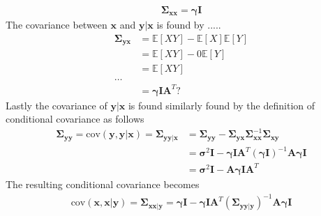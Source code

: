 \begin{align*}
\boldsymbol{\Sigma}_{\textbf{xx}} = \boldsymbol{\gamma}\textbf{I}
\end{align*} 
The covariance between $\textbf{x}$ and $\textbf{y}\vert\textbf{x}$ is found by .....
\begin{align*}
\boldsymbol{\Sigma}_{\textbf{yx}} &= \mathbb{E}[XY] - \mathbb{E}[X]\mathbb{E}[Y]\\
&= \mathbb{E}[XY] - 0 \mathbb{E}[Y] \\
&= \mathbb{E}[XY]\\
\hdots \\
&= \boldsymbol{\gamma}\textbf{I}\textbf{A}^T?
\end{align*}
Lastly the covariance of $\textbf{y}\vert \textbf{x}$ is found similarly found by the definition of conditional covariance as follows 
\begin{align*}
\boldsymbol{\Sigma}_{\textbf{yy}} =  \text{cov}(\textbf{y},\textbf{y}\vert \textbf{x}) = \boldsymbol{\Sigma}_{\textbf{yy}\vert \textbf{x}} &= \boldsymbol{\Sigma}_{\textbf{yy}} - \boldsymbol{\Sigma}_{\textbf{yx}}\boldsymbol{\Sigma}_{\textbf{xx}}^{-1}\boldsymbol{\Sigma}_{\textbf{xy}} \\
&= \boldsymbol{\sigma}^2 \textbf{I} - \boldsymbol{\gamma}\textbf{I}\textbf{A}^T (\boldsymbol{\gamma}\textbf{I})^{-1} \textbf{A}\boldsymbol{\gamma}\textbf{I} \\
&= \boldsymbol{\sigma}^2 \textbf{I} - \textbf{A}\boldsymbol{\gamma}\textbf{I}\textbf{A}^T
\end{align*} 
The resulting conditional covariance becomes 
\begin{align*}
\text{cov}(\textbf{x},\textbf{x}\vert \textbf{y}) = \boldsymbol{\Sigma}_{\textbf{xx}\vert\textbf{y}} = \boldsymbol{\gamma}\textbf{I} - \boldsymbol{\gamma}\textbf{I}\textbf{A}^T (\boldsymbol{\Sigma}_{\textbf{yy}\vert \textbf{y}})^{-1} \textbf{A} \boldsymbol{\gamma}\textbf{I}
\end{align*}
